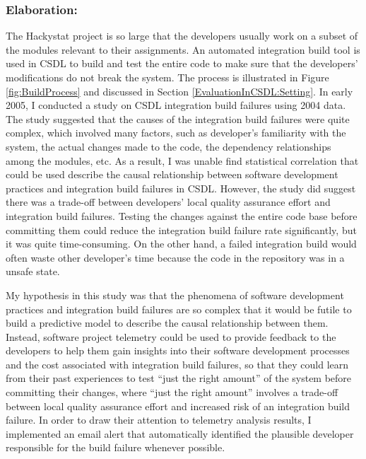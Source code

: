 \subsubsection{Elaboration:}

The Hackystat project is so large that the developers usually work on a subset of the modules relevant to their assignments. An automated integration build tool is used in CSDL to build and test the entire code to make sure that the developers' modifications do not break the system. The process is illustrated in Figure \ref{fig:BuildProcess} and discussed in Section \ref{EvaluationInCSDL:Setting}. 
In early 2005, I conducted a study on CSDL integration build failures using 2004 data. The study suggested that the causes of the integration build failures were quite complex, which involved many factors, such as developer's familiarity with the system, the actual changes made to the code, the dependency relationships among the modules, etc. As a result, I was unable find statistical correlation that could be used describe the causal relationship between software development practices and integration build failures in CSDL.
However, the study did suggest there was a trade-off between developers' local quality assurance effort and integration build failures. Testing the changes against the entire code base before committing them could reduce the integration build failure rate significantly, but it was quite time-consuming. On the other hand, a failed integration build would often waste other developer's time because the code in the repository was in a unsafe state.

My hypothesis in this study was that the phenomena of software development practices and integration build failures are so complex that it would be futile to build a predictive model to describe the causal relationship between them. Instead, software project telemetry could be used to provide feedback to the developers to help them gain insights into their software development processes and the cost associated with integration build failures, so that they could learn from their past experiences to test ``just the right amount'' of the system before committing their changes, where ``just the right amount'' involves a trade-off between local quality assurance effort and increased risk of an integration build failure. In order to draw their attention to telemetry analysis results, I implemented an email alert that automatically identified the plausible developer responsible for the build failure whenever possible.

